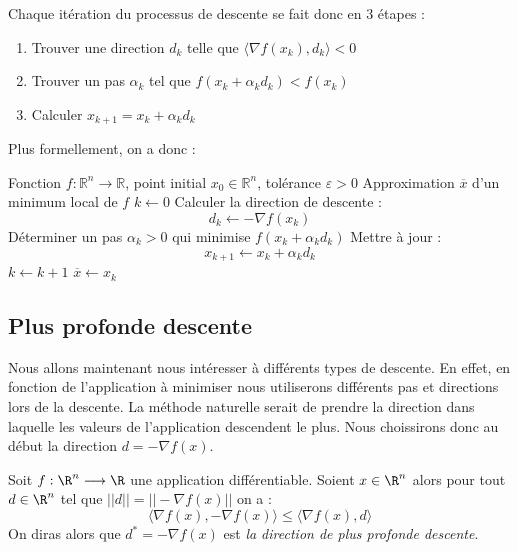 \begin{proposition}
    Chaque itération du processus de descente se fait donc en 3 étapes : 
    \begin{enumerate}
        \item Trouver une direction $d_k$ telle que $ \langle \nabla f(x_k) , d_k \rangle < 0$ 
        \item Trouver un pas $ \alpha_k$ tel que $f(x_k + \alpha_k d_k) < f(x_k)$
        \item Calculer $x_{k+1} = x_k + \alpha_k d_k $
    \end{enumerate}
\end{proposition}

Plus formellement, on a donc : 

\begin{algorithm}[H]
\caption{Algorithme de la Descente de Gradient}
\begin{algorithmic}[1]
\Require Fonction $f : \mathbb{R}^n \to \mathbb{R}$, point initial $x_0 \in \mathbb{R}^n$, tolérance $\varepsilon > 0$
\Ensure Approximation $\overline{x}$ d’un minimum local de $f$
\State $k \gets 0$
    \State Calculer la direction de descente :
        \[
            d_k \gets - \nabla f(x_k)
        \]
    \State Déterminer un pas $\alpha_k > 0$ qui minimise $f(x_k + \alpha_k d_k)$
    \State Mettre à jour :
        \[
            x_{k+1} \gets x_k + \alpha_k d_k
        \]
    \State $k \gets k + 1$
\EndWhile
\State \Return $\overline{x} \gets x_k$
\end{algorithmic}
\end{algorithm}


\subsection{Plus profonde descente}

Nous allons maintenant nous intéresser à différents types de descente. En effet, en fonction de l'application 
à minimiser nous utiliserons différents pas et directions lors de la descente. 
La méthode naturelle serait de prendre la direction dans laquelle les valeurs de l'application descendent le plus. 
Nous choissirons donc au début la direction $ d = - \nabla f(x)$. 

\begin{theorem}
    Soit $f : \R^n \longrightarrow \R$ une application différentiable. Soient $x \in \R^n$ alors 
    pour tout $d \in \R^n$ tel que $ ||d|| = || - \nabla f(x) ||$ on a : 
        \begin{equation}
            \langle \nabla f(x), - \nabla f(x) \rangle \leqslant \langle \nabla f(x), d \rangle
        \end{equation} 
    On diras alors que $d^* = - \nabla f(x)$ est \emph{la direction de plus profonde descente}. 
\end{theorem}

